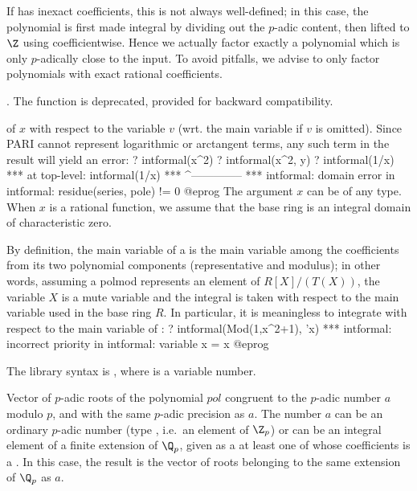 If  has inexact  coefficients, this is not always
well-defined; in this case, the polynomial is first made integral by dividing
out the $p$-adic content,  then lifted to $\Z$ using 
coefficientwise.
Hence we actually factor exactly a polynomial which is only $p$-adically
close to the input. To avoid pitfalls, we advise to only factor polynomials
with exact rational coefficients.

 . The function  is
deprecated, provided for backward compatibility.

\label{se:intformal}
 of $x$ with respect to the variable $v$ (wrt.
the main variable if $v$ is omitted). Since PARI cannot represent
logarithmic or arctangent terms, any such term in the result will yield an
error:
\bprog
 ? intformal(x^2)
 ? intformal(x^2, y)
 ? intformal(1/x)
   ***   at top-level: intformal(1/x)
   ***                 ^--------------
   *** intformal: domain error in intformal: residue(series, pole) != 0
@eprog
The argument $x$ can be of any type. When $x$ is a rational function, we
assume that the base ring is an integral domain of characteristic zero.

  By  definition,   the main variable of a  is the main variable
among the  coefficients  from  its  two  polynomial  components
(representative and modulus); in other words, assuming a polmod represents an
element of $R[X]/(T(X))$, the variable $X$ is a mute variable and the
integral is taken with respect to the main variable used in the base ring $R$.
In particular, it is meaningless to integrate with respect to the main
variable of :
\bprog
? intformal(Mod(1,x^2+1), 'x)
*** intformal: incorrect priority in intformal: variable x = x
@eprog

The library syntax is , where  is a variable number.

\label{se:padicappr}
Vector of $p$-adic roots of the
polynomial $pol$ congruent to the $p$-adic number $a$ modulo $p$, and with
the same $p$-adic precision as $a$. The number $a$ can be an ordinary
$p$-adic number (type , i.e.~an element of $\Z_p$) or can be an
integral element of a finite extension of $\Q_p$, given as a 
at least one of whose coefficients is a . In this case, the result
is the vector of roots belonging to the same extension of $\Q_p$ as $a$.

